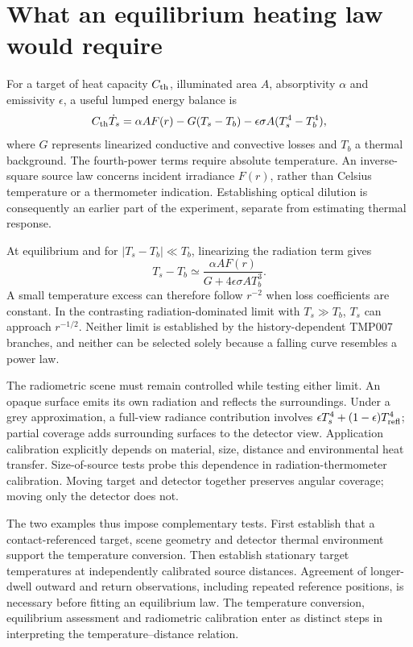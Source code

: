\section{What an equilibrium heating law would require}
For a target of heat capacity $C_{\rm th}$, illuminated area $A$, absorptivity $\alpha$ and emissivity $\epsilon$, a useful lumped energy balance is
\begin{equation}
 C_{\rm th}\dot T_s=\alpha A F(r)-G(T_s-T_b)
 -\epsilon\sigma A(T_s^4-T_b^4),
 \label{eq:ir-distance-balance}
\end{equation}
where $G$ represents linearized conductive and convective losses and $T_b$ a thermal background. The fourth-power terms require absolute temperature. An inverse-square source law concerns incident irradiance $F(r)$, rather than Celsius temperature or a thermometer indication. Establishing optical dilution is consequently an earlier part of the experiment, separate from estimating thermal response.

At equilibrium and for $|T_s-T_b|\ll T_b$, linearizing the radiation term gives
\begin{equation}
 T_s-T_b\simeq\frac{\alpha A F(r)}{G+4\epsilon\sigma A T_b^3}.
 \label{eq:ir-distance-smallrise}
\end{equation}
A small temperature excess can therefore follow $r^{-2}$ when loss coefficients are constant. In the contrasting radiation-dominated limit with $T_s\gg T_b$, $T_s$ can approach $r^{-1/2}$. Neither limit is established by the history-dependent TMP007 branches, and neither can be selected solely because a falling curve resembles a power law.

The radiometric scene must remain controlled while testing either limit. An opaque surface emits its own radiation and reflects the surroundings. Under a grey approximation, a full-view radiance contribution involves $\epsilon T_s^4+(1-\epsilon)T_{\rm refl}^4$; partial coverage adds surrounding surfaces to the detector view. Application calibration explicitly depends on material, size, distance and environmental heat transfer\cite{tmp007cal}. Size-of-source tests probe this dependence in radiation-thermometer calibration\cite{delucas2022}. Moving target and detector together preserves angular coverage; moving only the detector does not.

The two examples thus impose complementary tests. First establish that a contact-referenced target, scene geometry and detector thermal environment support the temperature conversion. Then establish stationary target temperatures at independently calibrated source distances. Agreement of longer-dwell outward and return observations, including repeated reference positions, is necessary before fitting an equilibrium law. The temperature conversion, equilibrium assessment and radiometric calibration enter as distinct steps in interpreting the temperature--distance relation.
